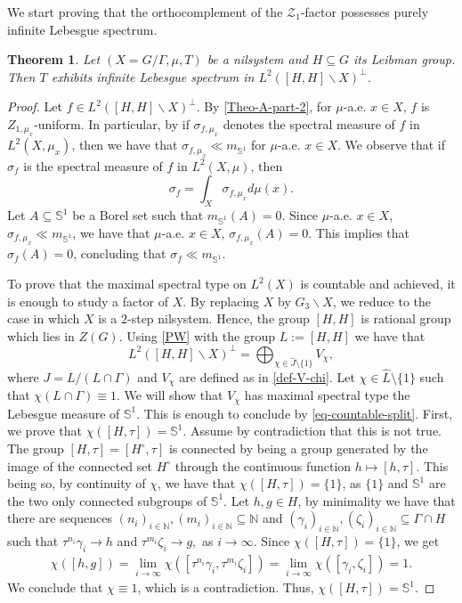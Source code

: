 \documentclass[letter, 11pt]{article}
\newtheorem{theorem}{Theorem}[section]
\theoremstyle{definition}
\theoremstyle{plain}
\newcommand{\N}{\mathbb{N}}
\newcommand{\bS}{\mathbb{S}}
\newcommand{\1}{\mathbbm{1}}
\begin{document}
We start proving that the orthocomplement of the $\mathcal{Z}_1$-factor possesses purely infinite Lebesgue spectrum. 
\begin{theorem}\label{Spectrum-uniform-part}
    Let $(X=G/\Gamma,\mu,T)$ be a nilsystem and $H\subseteq G$ its Leibman group. Then $T$ exhibits infinite Lebesgue spectrum in $L^2([H,H] \backslash X)^\perp$.
\end{theorem}
\begin{proof}
    Let $f\in L^2([H,H] \backslash X)^\perp$. By \cref{Theo-A-part-2}, for $\mu$-a.e. $x\in X$, $f$ is $Z_{1,\mu_x}$-uniform. In particular, by \cite[Theorem 1.4]{MR4797105} if $\sigma_{f,\mu_x}$ denotes the spectral measure of $f$ in $L^2(X,\mu_x)$, then we have that $\sigma_{f,\mu_x}\ll m_{\bS^1}$ for $\mu$-a.e. $x\in X$. We observe that if $\sigma_f$ is the spectral measure of $f$ in $L^2(X,\mu)$, then
    $$ \sigma_f = \int_X \sigma_{f,\mu_x} d\mu(x).$$
    Let $A\subseteq \bS^1$ be a Borel set such that $m_{\bS^1}(A)=0$. Since $\mu$-a.e. $x\in X$, $\sigma_{f,\mu_x}\ll m_{\bS^1}$, we have that $\mu$-a.e. $x\in X$, $\sigma_{f,\mu_x}(A)=0$. This implies that $\sigma_f(A)=0$, concluding that $\sigma_f\ll m_{\bS^1}. $
    
    To prove that the maximal spectral type on $L^2(X)$ is countable and achieved, it is enough to study a factor of $X$. By replacing $X$ by $G_3\backslash X$, we reduce to the case in which $X$ is a $2$-step nilsystem. Hence, the group $[H,H]$ is rational group which lies in $Z(G)$. Using \cref{PW} with the group $L:=[H,H]$ we have that
    \begin{equation}\label{eq-countable-split}
     L^2([H,H]\backslash X)^\perp=\bigoplus_{\chi \in \widehat{J}\setminus\{1\}} V_\chi,    
    \end{equation}
    where $J=L/(L\cap \Gamma)$ and $V_\chi$ are defined as in \cref{def-V-chi}. Let $\chi \in \hat{L}\setminus\{1\}$ such that $\chi(L\cap \Gamma)\equiv 1$. We will show that $V_\chi$ has maximal spectral type the Lebesgue measure of $\bS^1$. This is enough to conclude by \cref{eq-countable-split}. First, we prove that $\chi([H,\tau])= \bS^1$. Assume by contradiction that this is not true. The group $[H,\tau]=[H^\circ,\tau]$ is connected by being a group generated by the image of the connected set $H^\circ$ through the continuous function $h\mapsto [h,\tau]$. This being so, by continuity of $\chi$, we have that $\chi([H,\tau])=\{1\}$, as $\{1\}$ and $\bS^1$ are the two only connected subgroups of $\bS^1$. Let $h,g\in H$, by minimality we have that there are sequences $(n_i)_{i\in \N},(m_i)_{i\in \N}\subseteq \N$ and $(\gamma_{i})_{i\in \N},(\zeta_{i})_{i\in \N}\subseteq \Gamma\cap H$ such that $\tau^{n_i}\gamma_{i}\to h$ and $\tau^{m_i}\zeta_{i}\to g,$ as $i\to \infty.$ Since $\chi([H,\tau])=\{1\}$, we get
    \begin{align*}
        \chi([h,g])= \lim_{i\to\infty} \chi([\tau^{n_i}\gamma_i,\tau^{m_i}\zeta_i]) =\lim_{i\to\infty} \chi([\gamma_i,\zeta_i]) =1.
    \end{align*}
    We conclude that $\chi\equiv 1$, which is a contradiction. Thus, $\chi([H,\tau])= \bS^1$.


\end{proof}
\end{document}
